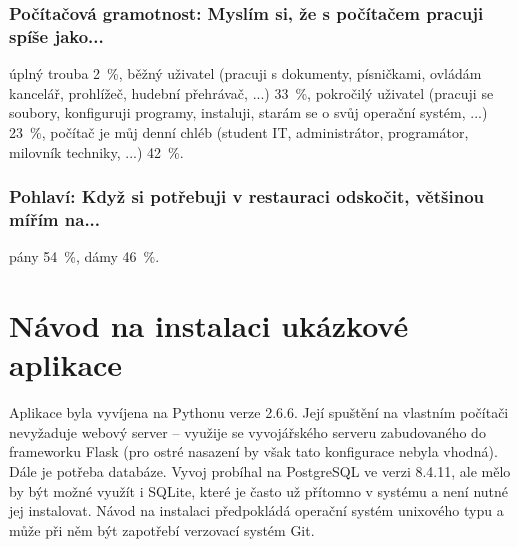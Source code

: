 \documentclass[12pt,oneside,final]{fithesis2}
\begin{document}
\subsection*{Počítačová gramotnost: Myslím si, že s počítačem pracuji spíše jako...}
úplný trouba 2~\%,
běžný uživatel (pracuji s dokumenty, písničkami, ovládám kancelář, prohlížeč, hudební přehrávač, ...) 33~\%,
pokročilý uživatel (pracuji se soubory, konfiguruji programy, instaluji, starám se o svůj operační systém, ...) 23~\%,
počítač je můj denní chléb (student IT, administrátor, programátor, milovník techniky, ...) 42~\%.

\subsection*{Pohlaví: Když si potřebuji v restauraci odskočit, většinou mířím na...}
pány 54~\%,
dámy 46~\%.



\chapter{Návod na instalaci ukázkové aplikace}\label{tutorial}
Aplikace byla vyvíjena na Pythonu verze 2.6.6. Její spuštění na vlastním počítači nevyžaduje webový server -- využije se vyvojářského serveru zabudovaného do frameworku Flask (pro ostré nasazení by však tato konfigurace nebyla vhodná). Dále je potřeba databáze. Vyvoj probíhal na PostgreSQL ve verzi 8.4.11, ale mělo by být možné využít i SQLite, které je často už přítomno v systému a není nutné jej instalovat. Návod na instalaci předpokládá operační systém unixového typu a může při něm být zapotřebí verzovací systém Git.
\end{document}
